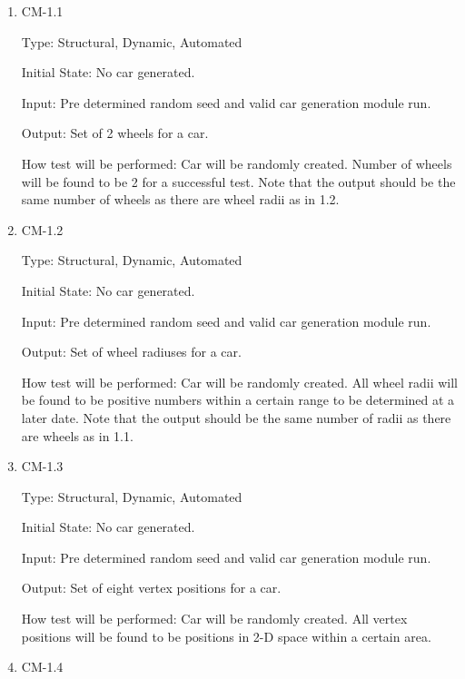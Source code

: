 \documentclass[12pt, titlepage]{article}
\begin{document}
\begin{enumerate}

\item{CM-1.1\\}

Type: Structural, Dynamic, Automated
					
Initial State: No car generated.
					
Input: Pre determined random seed and valid car generation module run.
					
\textcolor{RoyalPurple}{Output: Set of 2 wheels for a car.}
					
\textcolor{RoyalPurple}{How test will be performed: Car will be randomly created. 
Number of wheels will 
be found to be 2 for a successful test. Note that the output 
should be the same number of wheels as there are wheel radii as in 1.2.}

\item{CM-1.2\\}

Type: Structural, Dynamic, Automated
					
Initial State: No car generated.
					
Input: Pre determined random seed and valid  car generation module run.
					
Output: Set of wheel radiuses for a car.
					
\textcolor{RoyalPurple}{How test will be performed: Car will be randomly created. All 
wheel radii
will be found to be positive numbers within a certain range to be determined at 
a later date. Note that the output should be the same number of radii as 
there are wheels as in 1.1.}

\item{CM-1.3\\}

Type: Structural, Dynamic, Automated
					
Initial State: No car generated.
					
Input: Pre determined random seed and valid  car generation module run.
					
\textcolor{RoyalPurple}{Output: Set of eight vertex positions for a car.}
					
\textcolor{RoyalPurple}{How test will be performed: Car will be randomly created. All 
vertex positions 
will be found to be positions in 2-D space within a certain area.}

\item{CM-1.4\\}


\end{enumerate}
\end{document}
